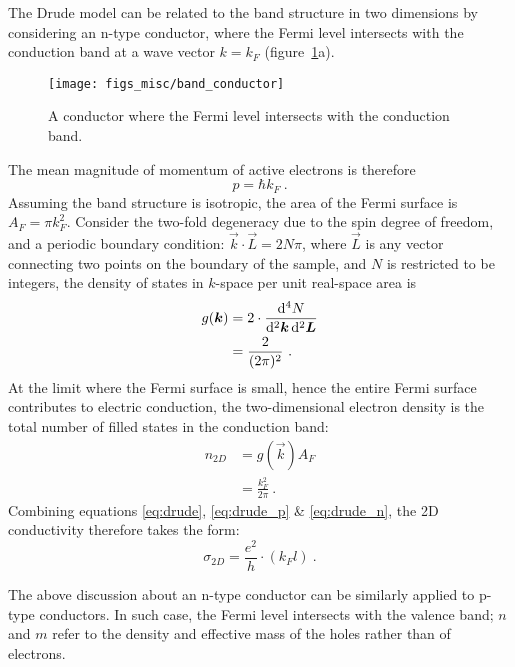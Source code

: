 The Drude model can be related to the band structure in two dimensions by considering an n-type conductor, where the Fermi level intersects with the conduction band at a wave vector $k = k_F$ (figure~\ref{fig:band_conductor}a). %
\begin{figure}[ht]%
    \centering%
    \texttt{[image: figs\_misc/band\_conductor]}%
    \caption[Band structure of an n-type conductor]{\label{fig:band_conductor}A conductor where the Fermi level intersects with the conduction band.}%
\end{figure}%
%
The mean magnitude of momentum of active electrons is therefore
\begin{equation}
    p = \hbar k_F~.\label{eq:drude_p}
\end{equation}%
Assuming the band structure is isotropic, the area of the Fermi surface is $A_F = \pi k_F^2$. Consider the two-fold degeneracy due to the spin degree of freedom, and a periodic boundary condition: $\vec{k} \cdot \vec{L} = 2N\pi$, where $\vec{L}$ is any vector connecting two points on the boundary of the sample, and $N$ is restricted to be integers, the density of states in $k$-space per unit real-space area is%
\begin{align}
    g(\vec{k}) &= 2\cdot\frac{\diff^4N}{\diff^2 \vec{k} \diff^2 \vec{L}}\nonumber\\
        & = \frac{2}{(2\pi)^2}~.
\end{align}%
At the limit where the Fermi surface is small, hence the entire Fermi surface contributes to electric conduction, the two-dimensional electron density is the total number of filled states in the conduction band:%
\begin{align}
    n_{2D} &= g(\vec{k}) A_F\nonumber\\
        &= \frac{k_F^2}{2\pi}~.\label{eq:drude_n}
\end{align}%
Combining equations \ref{eq:drude}, \ref{eq:drude_p} \& \ref{eq:drude_n}, the 2D conductivity therefore takes the form:
\begin{equation}
    \sigma_{2D} = \frac{e^2}{h} \cdot (k_F l)~.\label{eq:drude_2d}
\end{equation}%

The above discussion about an n-type conductor can be similarly applied to p-type conductors. In such case, the Fermi level intersects with the valence band; $n$ and $m$ refer to the density and effective mass of the holes rather than of electrons.

